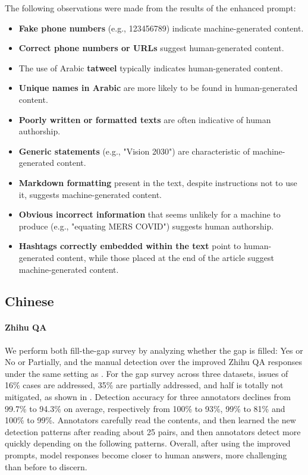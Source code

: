 The following observations were made from the results of the enhanced prompt:

\begin{itemize}
    \item \textbf{Fake phone numbers} (e.g., 123456789) indicate machine-generated content.
    \item \textbf{Correct phone numbers or URLs} suggest human-generated content.
    \item The use of Arabic \textbf{tatweel} typically indicates human-generated content.
    \item \textbf{Unique names in Arabic} are more likely to be found in human-generated content.
    \item \textbf{Poorly written or formatted texts} are often indicative of human authorship.
    \item \textbf{Generic statements} (e.g., "Vision 2030") are characteristic of machine-generated content.
    \item \textbf{Markdown formatting} present in the text, despite instructions not to use it, suggests machine-generated content.
    \item \textbf{Obvious incorrect information} that seems unlikely for a machine to produce (e.g., "equating MERS COVID") suggests human authorship.
    \item \textbf{Hashtags correctly embedded within the text} point to human-generated content, while those placed at the end of the article suggest machine-generated content.
\end{itemize}


\subsection{Chinese}

\paragraph{Zhihu QA}
We perform both fill-the-gap survey by analyzing whether the gap is filled: Yes or No or Partially, and the manual detection over the improved Zhihu QA responses under the same setting as .
For the gap survey across three datasets, issues of 16\% cases are addressed, 35\% are partially addressed, and half is totally not mitigated, as shown in .
Detection accuracy for three annotators declines from 99.7\% to 94.3\% on average, respectively from 100\% to 93\%, 99\% to 81\% and 100\% to 99\%.
Annotators carefully read the contents, and then learned the new detection patterns after reading about 25 pairs, and then annotators detect more quickly depending on the following patterns. Overall, after using the improved prompts, model responses become closer to human answers, more challenging than before to discern.


